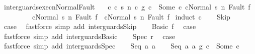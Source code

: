 \begin{isabellebody}
\isamarkupfalse%
%
\endisatagproof
{\isafoldproof}%
%
\isadelimproof
\isanewline
%
\endisadelimproof
\isanewline
\isanewline
{}\isamarkupfalse%
\ inter{\isacharunderscore}guards{\isacharunderscore}execn{\isacharunderscore}Normal{\isacharunderscore}Fault{\isacharcolon}\ \isanewline
\ \ {\isachardoublequoteopen}{\isasymAnd}c\ c{}\ s\ n{\isachardot}\ {\isasymlbrakk}{\isacharparenleft}c{}\ {\isasyminter}\isactrlsub g\ c{}{\isacharparenright}\ {\isacharequal}\ Some\ c{\isacharsemicolon}\ {\isasymGamma}{\isasymturnstile}{\isasymlangle}c{\isacharcomma}Normal\ s{\isasymrangle}\ {\isacharequal}n{\isasymRightarrow}\ Fault\ f{\isasymrbrakk}\isanewline
\ \ \ \ \ \ \ \ {\isasymLongrightarrow}\ {\isacharparenleft}{\isasymGamma}{\isasymturnstile}{\isasymlangle}c{}{\isacharcomma}Normal\ s{\isasymrangle}\ {\isacharequal}n{\isasymRightarrow}\ Fault\ f\ {\isasymor}\ {\isasymGamma}{\isasymturnstile}{\isasymlangle}c{}{\isacharcomma}Normal\ s{\isasymrangle}\ {\isacharequal}n{\isasymRightarrow}\ Fault\ f{\isacharparenright}{\isachardoublequoteclose}\isanewline
%
\isadelimproof
%
\endisadelimproof
%
\isatagproof
{}\isamarkupfalse%
\ {\isacharparenleft}induct\ c{}{\isacharparenright}\isanewline
\ \ \isamarkupfalse%
\ Skip\ \isamarkupfalse%
\ {\isacharquery}case\ \isamarkupfalse%
\ {\isacharparenleft}fastforce\ simp\ add{\isacharcolon}\ inter{\isacharunderscore}guards{\isacharunderscore}Skip{\isacharparenright}\isanewline
{}\isamarkupfalse%
\isanewline
\ \ \isamarkupfalse%
\ {\isacharparenleft}Basic\ f{\isacharparenright}\ \isamarkupfalse%
\ {\isacharquery}case\ \isamarkupfalse%
\ {\isacharparenleft}fastforce\ simp\ add{\isacharcolon}\ inter{\isacharunderscore}guards{\isacharunderscore}Basic{\isacharparenright}\isanewline
{}\isamarkupfalse%
\isanewline
\ \ \isamarkupfalse%
\ {\isacharparenleft}Spec\ r{\isacharparenright}\ \isamarkupfalse%
\ {\isacharquery}case\ \isamarkupfalse%
\ {\isacharparenleft}fastforce\ simp\ add{\isacharcolon}\ inter{\isacharunderscore}guards{\isacharunderscore}Spec{\isacharparenright}\isanewline
{}\isamarkupfalse%
\isanewline
\ \ \isamarkupfalse%
\ {\isacharparenleft}Seq\ a{}\ a{}{\isacharparenright}\isanewline
\ \ \isamarkupfalse%
\ {\isachardoublequoteopen}{\isacharparenleft}Seq\ a{}\ a{}\ {\isasyminter}\isactrlsub g\ c{}{\isacharparenright}\ {\isacharequal}\ Some\ c{\isachardoublequoteclose}\ \isamarkupfalse%

\end{isabellebody}
